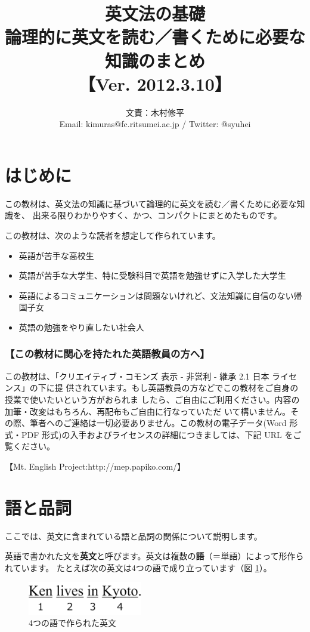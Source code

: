 \documentclass[12pt,titlepage]{jsarticle}
\title{英文法の基礎\\ 論理的に英文を読む／書くために必要な知識のまとめ\\【Ver. 2012.3.10】}
\author{文責：木村修平\\Email: kimuras@fc.ritsumei.ac.jp / Twitter: @syuhei}
\begin{document}
\maketitle
\tableofcontents

\newpage


\setcounter{section}{-1}
 \section{はじめに}
 この教材は、英文法の知識に基づいて論理的に英文を読む／書くために必要な知識を、
 出来る限りわかりやすく、かつ、コンパクトにまとめたものです。

 この教材は、次のような読者を想定して作られています。
 \begin{itemize}
  \item 英語が苦手な高校生
  \item 英語が苦手な大学生、特に受験科目で英語を勉強せずに入学した大学生
  \item 英語によるコミュニケーションは問題ないけれど、文法知識に自信のない帰国子女
  \item 英語の勉強をやり直したい社会人
 \end{itemize}

   \subsubsection*{【この教材に関心を持たれた英語教員の方へ】}
   この教材は、「クリエイティブ・コモンズ 表示 - 非営利 - 継承 2.1 日本 ライセンス」の下に提 供されています。もし英語教員の方などでこの教材をご自身の授業で使いたいという方がおられま したら、ご自由にご利用ください。内容の加筆・改変はもちろん、再配布もご自由に行なっていただ いて構いません。その際、筆者へのご連絡は一切必要ありません。この教材の電子データ(Word 形式・PDF 形式)の入手およびライセンスの詳細につきましては、下記 URL をご覧ください。

【Mt. English Project:http://mep.papiko.com/】

 \section{語と品詞}
 ここでは、英文に含まれている語と品詞の関係について説明します。
 
 英語で書かれた文を{\bf 英文}と呼びます。英文は複数の{\bf 語}（＝単語）によって形作られています。
 たとえば次の英文は4つの語で成り立っています（図 \ref{fig1}）。

 
 \begin{figure}[htbp]
  \begin{center}
   \includegraphics[width=5cm]{./figure/fig1.pdf}
   \caption{4つの語で作られた英文}
   \label{fig1}
  \end{center}
 \end{figure}
 
\end{document}
